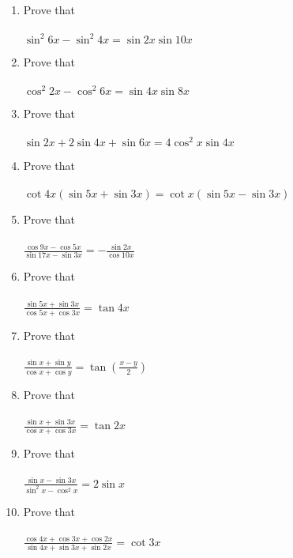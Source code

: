 \begin{enumerate}[label=\arabic*.,ref=\thesubsection.\theenumi]
\item Prove that\\
\\$\sin^{2}6x-\sin^{2}4x=\sin2x\sin10x$\\

\item Prove that\\
\\$\cos^{2}2x-\cos^{2}6x=\sin4x\sin8x$\\

\item Prove that\\
\\$\sin2x+2\sin4x+\sin6x=4\cos^{2}x\sin4x$\\

\item Prove that\\
\\$\cot4x(\sin5x+\sin3x)= \cot x(\sin5x-\sin3x)$\\

\item Prove that\\
\\$\frac{\cos9x-\cos5x}{\sin17x-\sin3x}=-\frac{\sin2x}{\cos10x}$\\

\item Prove that\\
\\$\frac{\sin5x+\sin3x}{\cos5x+\cos3x}=\tan4x$\\

\item Prove that\\
\\$\frac{\sin x+\sin y}{\cos x+\cos y}=\tan(\frac{x-y}{2})$\\

\item Prove that\\
\\$\frac{\sin x+\sin3x}{\cos x+\cos3x}=\tan2x$\\

\item Prove that\\
\\$\frac{\sin x-\sin3x}{\sin^{2}x-\cos^{2}x}=2\sin x$\\

\item Prove that\\
\\$\frac{\cos4x+\cos3x+\cos2x}{\sin4x+\sin3x+\sin2x}=\cot3x$\\


\end{enumerate}
